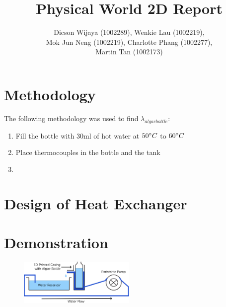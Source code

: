 \documentclass[10pt,a4paper]{ieeetran}
\author{Dicson Wijaya (1002289), Wenkie Lau (1002219), \\ Mok Jun Neng (1002219), Charlotte Phang (1002277),\\ Martin Tan (1002173)}
\title{Physical World 2D Report}
\begin{document}
	\maketitle
	\section{Methodology}
	 The following methodology was used to find $\lambda_{algae bottle}$:\\
	 \begin{enumerate}
	 	\item Fill the bottle with 30ml of hot water at $50 \degree C$ to $60 \degree C$
	 	\item Place thermocouples in the bottle and the tank
	 	\item 
	 \end{enumerate}
 	
 	\section{Design of Heat Exchanger}
 	
 	\section{Demonstration}
 		\begin{figure}[H]
 			\begin{center}
 				\includegraphics[width=0.5\textwidth]{demo_setup.png}
 				\caption{}
 				\label{fig:demo_setup}
 			\end{center}
 		\end{figure}
	 
\end{document}
